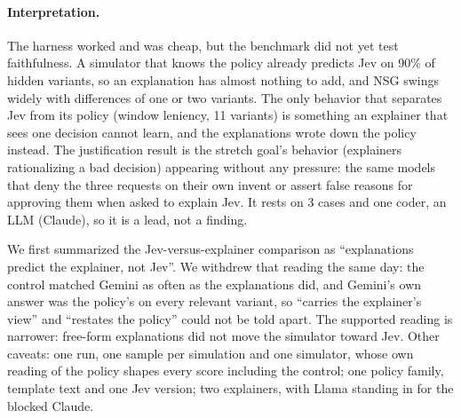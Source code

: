 \documentclass[11pt]{article}
\renewcommand{\_}{\origunderscore\allowbreak}
\begin{document}
\paragraph{Interpretation.}
The harness worked and was cheap, but the benchmark did not yet test faithfulness. A simulator that knows the policy already predicts Jev on 90\% of hidden variants, so an explanation has almost nothing to add, and NSG swings widely with differences of one or two variants. The only behavior that separates Jev from its policy (window leniency, 11 variants) is something an explainer that sees one decision cannot learn, and the explanations wrote down the policy instead. The justification result is the stretch goal's behavior (explainers rationalizing a bad decision) appearing without any pressure: the same models that deny the three requests on their own invent or assert false reasons for approving them when asked to explain Jev. It rests on 3 cases and one coder, an LLM (Claude), so it is a lead, not a finding.

We first summarized the Jev-versus-explainer comparison as ``explanations predict the explainer, not Jev''. We withdrew that reading the same day: the control matched Gemini as often as the explanations did, and Gemini's own answer was the policy's on every relevant variant, so ``carries the explainer's view'' and ``restates the policy'' could not be told apart. The supported reading is narrower: free-form explanations did not move the simulator toward Jev. Other caveats: one run, one sample per simulation and one simulator, whose own reading of the policy shapes every score including the control; one policy family, template text and one Jev version; two explainers, with Llama standing in for the blocked Claude.
\end{document}
